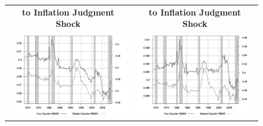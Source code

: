 \documentclass[10pt]{article}
\begin{document}
{\begin{figure}
\begin{tabular}{cc}
\textbf{to Inflation Judgment Shock} & \textbf{to Inflation Judgment Shock}  \\
\includegraphics[scale=0.17]{images/RMS16_Output_Gap_Inflation_Judgment_Shock.png} & \includegraphics[scale=0.17]{images/RMS16_Inflation_Inflation_Judgment_Shock.png} \\
\end{tabular}
\end{figure}

}
\end{document}
